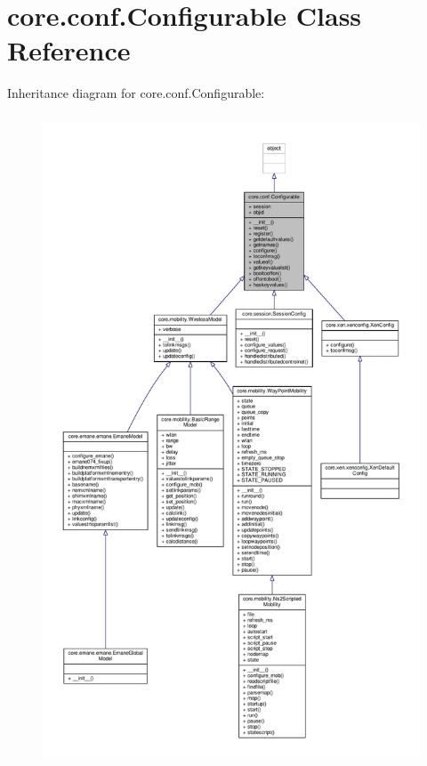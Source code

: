\hypertarget{classcore_1_1conf_1_1_configurable}{\section{core.\+conf.\+Configurable Class Reference}
\label{classcore_1_1conf_1_1_configurable}
}


Inheritance diagram for core.\+conf.\+Configurable\+:
\nopagebreak
\begin{figure}[H]
\begin{center}
\leavevmode
\includegraphics[height=550pt]{classcore_1_1conf_1_1_configurable__inherit__graph}
\end{center}
\end{figure}


